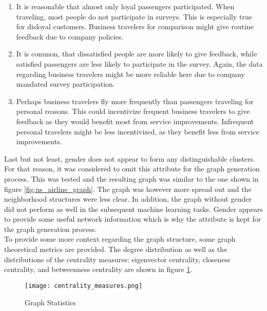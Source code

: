   \begin{enumerate}
    \item It is reasonable that almost only loyal passengers participated. When 
      traveling, most people do not participate in surveys. This is especially 
      true for disloyal customers. Business travelers for comparison might give
      routine feedback due to company policies.
    \item It is common, that dissatisfied people are more likely to give
      feedback, while satisfied passengers are less likely to participate in
      the survey. Again, the data regarding business travelers might be more
      reliable here due to company mandated survey participation.
    \item Perhaps business travelers fly more frequently than passengers
      traveling for personal reasons. This could incentivize frequent business
      travelers to give feedback as they would benefit most from service
      improvements. Infrequent personal travelers might be less incentivized,
      as they benefit less from service improvements. 
  \end{enumerate}

  \noindent Last but not least, gender does not appear to form any distinguishable 
  clusters. For that reason, it was considered to omit this attribute for the 
  graph generation process. This was tested and the resulting graph was similar
  to the one shown in figure \ref{fig:us_airline_graph}. The graph was however 
  more spread out and the neighborhood structures were less clear. In addition, 
  the graph without gender did not perform as well in the subsequent machine 
  learning tasks. Gender appears to provide some useful network information 
  which is why the attribute is kept for the graph generation process. \\

  \noindent To provide some more context regarding the graph structure, some
  graph theoretical metrics are provided. The degree distribution as well as 
  the distributions of the centrality measures: eigenvector centrality, 
  closeness centrality, and betweenness centrality are shown in 
  figure \ref{fig:centrality_measures}.

  \begin{figure}[h]
	  \centering
	  \texttt{[image: centrality\_measures.png]}
	  \caption{Graph Statistics}
      \label{fig:centrality_measures}
  \end{figure}

